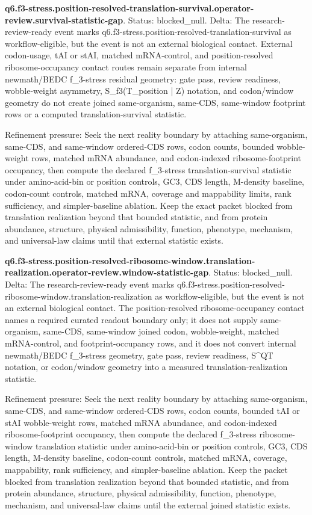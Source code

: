 \textbf{q6.f3-stress.position-resolved-translation-survival.operator-review.survival-statistic-gap}. Status: blocked\_null. Delta: The research-review-ready event marks q6.f3-stress.position-resolved-translation-survival as workflow-eligible, but the event is not an external biological contact. External codon-usage, tAI or stAI, matched mRNA-control, and position-resolved ribosome-occupancy contact routes remain separate from internal newmath/BEDC f\_3-stress residual geometry: gate pass, review readiness, wobble-weight asymmetry, S\_f3(T\_position | Z) notation, and codon/window geometry do not create joined same-organism, same-CDS, same-window footprint rows or a computed translation-survival statistic.

Refinement pressure: Seek the next reality boundary by attaching same-organism, same-CDS, and same-window ordered-CDS rows, codon counts, bounded wobble-weight rows, matched mRNA abundance, and codon-indexed ribosome-footprint occupancy, then compute the declared f\_3-stress translation-survival statistic under amino-acid-bin or position controls, GC3, CDS length, M-density baseline, codon-count controls, matched mRNA, coverage and mappability limits, rank sufficiency, and simpler-baseline ablation. Keep the exact packet blocked from translation realization beyond that bounded statistic, and from protein abundance, structure, physical admissibility, function, phenotype, mechanism, and universal-law claims until that external statistic exists.

\textbf{q6.f3-stress.position-resolved-ribosome-window.translation-realization.operator-review.window-statistic-gap}. Status: blocked\_null. Delta: The research-review-ready event marks q6.f3-stress.position-resolved-ribosome-window.translation-realization as workflow-eligible, but the event is not an external biological contact. The position-resolved ribosome-occupancy contact names a required curated readout boundary only; it does not supply same-organism, same-CDS, same-window joined codon, wobble-weight, matched mRNA-control, and footprint-occupancy rows, and it does not convert internal newmath/BEDC f\_3-stress geometry, gate pass, review readiness, S\textasciicircum{}QT notation, or codon/window geometry into a measured translation-realization statistic.

Refinement pressure: Seek the next reality boundary by attaching same-organism, same-CDS, and same-window ordered-CDS rows, codon counts, bounded tAI or stAI wobble-weight rows, matched mRNA abundance, and codon-indexed ribosome-footprint occupancy, then compute the declared f\_3-stress ribosome-window translation statistic under amino-acid-bin or position controls, GC3, CDS length, M-density baseline, codon-count controls, matched mRNA, coverage, mappability, rank sufficiency, and simpler-baseline ablation. Keep the packet blocked from translation realization beyond that bounded statistic, and from protein abundance, structure, physical admissibility, function, phenotype, mechanism, and universal-law claims until the external joined statistic exists.

